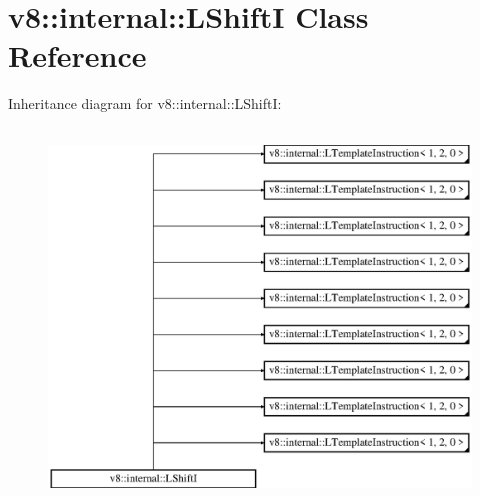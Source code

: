 \hypertarget{classv8_1_1internal_1_1_l_shift_i}{}\section{v8\+:\+:internal\+:\+:L\+ShiftI Class Reference}
\label{classv8_1_1internal_1_1_l_shift_i}
Inheritance diagram for v8\+:\+:internal\+:\+:L\+ShiftI\+:\begin{figure}[H]
\begin{center}
\leavevmode
\includegraphics[height=10.000000cm]{classv8_1_1internal_1_1_l_shift_i}
\end{center}
\end{figure}
